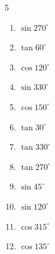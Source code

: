 \begin{multicols}{5}
\begin{enumerate}

  \item $\displaystyle \sin{270^\circ}$

        \phantom{$\displaystyle =-1$}

\columnbreak %

\resetques

  \item $\displaystyle \tan{60^\circ}$


  \item $\displaystyle \cos{120^\circ}$


  \item $\displaystyle \sin{330^\circ}$


  \item $\displaystyle \cos{150^\circ}$


  \item $\displaystyle \tan{30^\circ}$


  \item $\displaystyle \tan{330^\circ}$


  \item $\displaystyle \tan{270^\circ}$

        \phantom{$\displaystyle なし$}

  \item $\displaystyle \sin{45^\circ}$


  \item $\displaystyle \sin{120^\circ}$


  \item $\displaystyle \cos{315^\circ}$


  \item $\displaystyle \cos{135^\circ}$


\end{enumerate}
\end{multicols}
